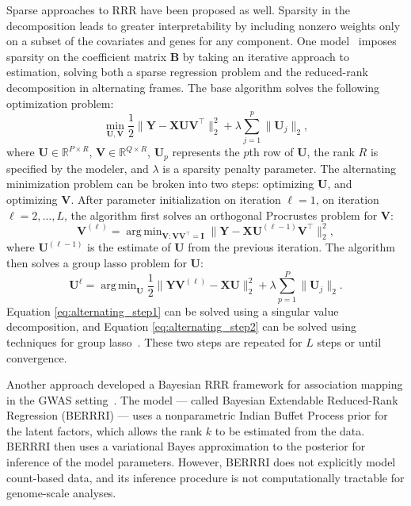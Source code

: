 \documentclass{bmcart}
\DeclareMathOperator*{\argmin}{arg\,min}
\begin{document}
Sparse approaches to RRR have been proposed as well. Sparsity in the decomposition leads to greater interpretability by including nonzero weights only on a subset of the covariates and genes for any component. One model~\citep{Qian2020.05.30.125252} imposes sparsity on the coefficient matrix $\mathbf{B}$ by taking an iterative approach to estimation, solving both a sparse regression problem and the reduced-rank decomposition in alternating frames. The base algorithm solves the following optimization problem:
\begin{equation*}
    \min_{\mathbf{U}, \mathbf{V}} \frac{1}{2} \|\mathbf{Y}-\mathbf{X}\mathbf{U}\mathbf{V}^\top\|_2^2 + \lambda \sum^{p}_{j=1}\|\mathbf{U}_j\|_2,
\end{equation*}
where $\mathbf{U} \in \mathbb{R}^{P \times R}$, $\mathbf{V} \in \mathbb{R}^{Q \times R}$, $\mathbf{U}_p$ represents the $p$th row of $\mathbf{U}$, the rank $R$ is specified by the modeler, and $\lambda$ is a sparsity penalty parameter. The alternating minimization problem can be broken into two steps: optimizing $\mathbf{U}$, and optimizing $\mathbf{V}$. After parameter initialization on iteration $\ell = 1$, on iteration $\ell = 2, \dots, L$, the algorithm first solves an orthogonal Procrustes problem for $\mathbf{V}$:
\begin{equation} \label{eq:alternating_step1}
    \mathbf{V}^{(\ell)} = \argmin_{\mathbf{V}:\mathbf{V}\mathbf{V}^\top=\mathbf{I}} \|\mathbf{Y} - \mathbf{X}\mathbf{U}^{(\ell - 1)}\mathbf{V}^\top\|_2^2,
\end{equation}
where $\mathbf{U}^{(\ell - 1)}$ is the estimate of $\mathbf{U}$ from the previous iteration. The algorithm then solves a group lasso problem for $\mathbf{U}$:
\begin{equation} \label{eq:alternating_step2}
    \mathbf{U}^{\ell} = \argmin_{\mathbf{U}} \frac{1}{2} \|\mathbf{Y}\mathbf{V}^{(\ell)}-\mathbf{X}\mathbf{U}\|_2^2 + \lambda \sum^{P}_{p=1} \|\mathbf{U}_j\|_2.
\end{equation}
Equation \eqref{eq:alternating_step1} can be solved using a singular value decomposition, and Equation \eqref{eq:alternating_step2} can be solved using techniques for group lasso~\citep{friedman2010note}. These two steps are repeated for $L$ steps or until convergence.

Another approach developed a Bayesian RRR framework for association mapping in the GWAS setting~\citep{valente2015nonparametric}. The model --- called Bayesian Extendable Reduced-Rank Regression (BERRRI) --- uses a nonparametric Indian Buffet Process prior for the latent factors, which allows the rank $k$ to be estimated from the data. BERRRI then uses a variational Bayes approximation to the posterior for inference of the model parameters. However, BERRRI does not explicitly model count-based data, and its inference procedure is not computationally tractable for genome-scale analyses. 
\end{document}
